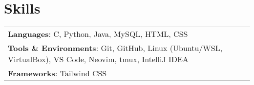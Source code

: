 \documentclass[letterpaper,11pt]{article}
\begin{document}
    
\section{Skills}
    \vspace{-2pt}
    \begin{itemize}[leftmargin=0.2in, label={}]
        {\item{
            \begin{tabular}{ l@{\hskip 0.2in} l }
                 \textbf{Languages}{: C, Python, Java, MySQL, HTML, CSS} \\
                \textbf{Tools \& Environments}{: Git, GitHub, Linux (Ubuntu/WSL, VirtualBox), VS Code, Neovim, tmux, IntelliJ IDEA} \\
                \textbf{Frameworks}{: Tailwind CSS}
            \end{tabular}
        }}
    \end{itemize}
\vspace{-20pt}
\end{document}
